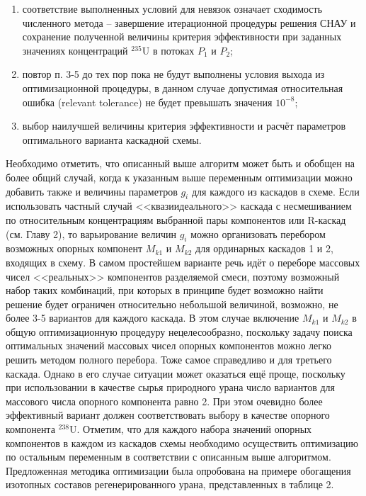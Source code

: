 \begin{enumerate}
    \item соответствие выполненных условий для невязок означает сходимость численного метода -- завершение итерационной процедуры решения СНАУ и сохранение полученной величины критерия эффективности при заданных значениях концентраций $^{235}$U в потоках $P_1$ и $P_2$;
    \item повтор п. 3-5 до тех пор пока не будут выполнены условия выхода из оптимизационной процедуры, в данном случае допустимая относительная ошибка (relevant tolerance) не будет превышать значения $10^{-8}$;
    \item выбор наилучшей величины критерия эффективности и расчёт параметров оптимального варианта каскадной схемы.
\end{enumerate}

Необходимо отметить, что описанный выше алгоритм может быть и обобщен на более общий случай, когда к указанным выше переменным оптимизации можно добавить также и величины параметров $g_{i}$ для каждого из каскадов в схеме.  Если использовать частный случай <<квазиидеального>> каскада с несмешиванием по относительным концентрациям выбранной пары компонентов или R-каскад (см. Главу 2), то варьирование величин $g_{i}$ можно организовать перебором возможных опорных компонент $M_{k1}$ и $M_{k2}$ для ординарных каскадов 1 и 2, входящих в схему. В самом простейшем варианте речь идёт о переборе массовых чисел <<реальных>> компонентов разделяемой смеси, поэтому возможный набор таких комбинаций, при которых в принципе будет возможно найти решение будет ограничен относительно небольшой величиной, возможно, не более 3-5 вариантов для каждого каскада. В этом случае включение $M_{k1}$ и $M_{k2}$ в общую оптимизационную процедуру нецелесообразно, поскольку задачу поиска оптимальных значений массовых чисел опорных компонентов можно легко решить методом полного перебора. Тоже самое справедливо и для третьего каскада. Однако в его случае ситуации может оказаться ещё проще, поскольку при использовании в качестве сырья природного урана число вариантов для массового числа опорного компонента равно 2. При этом очевидно более эффективный вариант должен соответствовать выбору в качестве опорного компонента $^{238}$U. Отметим, что для каждого набора значений опорных компонентов в каждом из каскадов схемы необходимо осуществить оптимизацию по остальным переменным в соответствии с описанным выше алгоритмом. 
Предложенная методика оптимизации была опробована на примере обогащения изотопных составов регенерированного урана, представленных в таблице 2.


